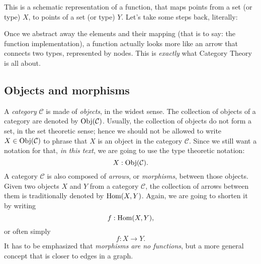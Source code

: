 \documentclass[12pt,a4paper]{report}
\theoremstyle{theorem}
\theoremstyle{definition}
\begin{document}
\begin{center}
\end{center}
This is a schematic representation of a function, that maps points
from a set (or type) $X$, to points of a set (or type) $Y$.
Let's take some steps back, literally:
\begin{center}
\end{center}
Once we abstract away the elements and their mapping (that is to say:
the function implementation), a function 
actually looks more like an arrow that connects two
types, represented by nodes.
This is \emph{exactly} what Category Theory is all about.

\subsection{Objects and   morphisms}

A \emph{category} $\mathcal{C}$
is made of \emph{objects}, in the widest sense.
The collection of objects of a category are denoted by
${\rm Obj}(\mathcal{C})$. Usually, the collection of objects do not form
a set, in the set theoretic sense; hence we should not be allowed to
write $X\in{\rm Obj}(\mathcal{C})$
to phrase that $X$ is an object in the category
$\mathcal{C}$. Since we still want a notation for that, \emph{in this text},
we are going to use the type theoretic notation:
	\[ X : {\rm Obj}(\mathcal{C}) . \]
A category $\mathcal{C}$ is also composed of \emph{arrows},
or \emph{morphisms}, between those
objects. Given two objects $X$ and $Y$ from a category $\mathcal{C}$,
the collection of arrows between them is traditionally denoted by
${\rm Hom}(X,Y)$. Again, we are going to
shorten it by writing
	\[ f: {\rm Hom}(X,Y) ,\]
or often simply
	\[ f : X\to Y .\]
It has to be emphasized that \emph{morphisms are no functions}, but a more
general concept that is closer to edges in a graph.
\end{document}
